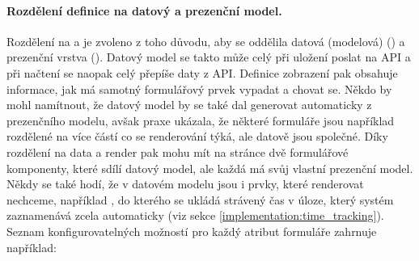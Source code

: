 \paragraph{Rozdělení definice na datový a prezenční model.} Rozdělení na  a  je zvoleno z toho důvodu, aby se oddělila datová (modelová) () a prezenční vrstva (). Datový model se takto může celý při uložení poslat na API a při načtení se naopak celý přepíše daty z API. Definice zobrazení pak obsahuje informace, jak má samotný formulářový prvek vypadat a chovat se. Někdo by mohl namítnout, že datový model by se také dal generovat automaticky z prezenčního modelu, avšak praxe ukázala, že některé formuláře jsou například rozdělené na více částí co se renderování týká, ale datově jsou společné. Díky rozdělení na data a render pak mohu mít na stránce dvě formulářové komponenty, které sdílí datový model, ale každá má svůj vlastní prezenční model. Někdy se také hodí, že v datovém modelu jsou i prvky, které renderovat nechceme, například , do kterého se ukládá strávený čas v úloze, který systém zaznamenává zcela automaticky (viz sekce \ref{implementation:time_tracking}). \\
Seznam konfigurovatelných možností pro každý atribut formuláře zahrnuje například:

